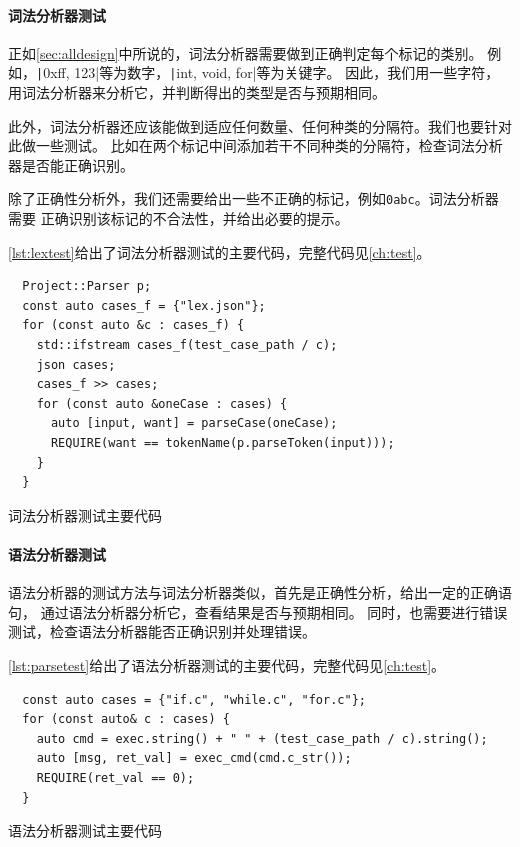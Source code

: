 \paragraph{词法分析器测试}

正如\autoref{sec:alldesign}中所说的，词法分析器需要做到正确判定每个标记的类别。
例如，\texttt|0xff, 123|等为数字，\texttt|int, void, for|等为关键字。
因此，我们用一些字符，用词法分析器来分析它，并判断得出的类型是否与预期相同。

此外，词法分析器还应该能做到适应任何数量、任何种类的分隔符。我们也要针对此做一些测试。
比如在两个标记中间添加若干不同种类的分隔符，检查词法分析器是否能正确识别。

除了正确性分析外，我们还需要给出一些不正确的标记，例如{\tt 0abc}。词法分析器需要
正确识别该标记的不合法性，并给出必要的提示。

\autoref{lst:lextest}给出了词法分析器测试的主要代码，完整代码见\autoref{ch:test}。

\begin{listing}[hbt]
  \begin{verbatim}
  Project::Parser p;
  const auto cases_f = {"lex.json"};
  for (const auto &c : cases_f) {
    std::ifstream cases_f(test_case_path / c);
    json cases;
    cases_f >> cases;
    for (const auto &oneCase : cases) {
      auto [input, want] = parseCase(oneCase);
      REQUIRE(want == tokenName(p.parseToken(input)));
    }
  }
  \end{verbatim}
  \caption{词法分析器测试主要代码}\label{lst:lextest}
\end{listing}

\paragraph{语法分析器测试}

语法分析器的测试方法与词法分析器类似，首先是正确性分析，给出一定的正确语句，
通过语法分析器分析它，查看结果是否与预期相同。
同时，也需要进行错误测试，检查语法分析器能否正确识别并处理错误。

\autoref{lst:parsetest}给出了语法分析器测试的主要代码，完整代码见\autoref{ch:test}。

\begin{listing}[hbt]
  \begin{verbatim}
  const auto cases = {"if.c", "while.c", "for.c"};
  for (const auto& c : cases) {
    auto cmd = exec.string() + " " + (test_case_path / c).string();
    auto [msg, ret_val] = exec_cmd(cmd.c_str());
    REQUIRE(ret_val == 0);
  }
  \end{verbatim}
  \caption{语法分析器测试主要代码}\label{lst:parsetest}
\end{listing}

